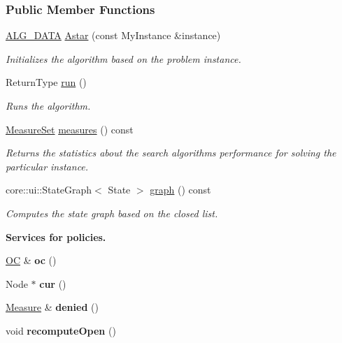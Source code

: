 \subsubsection*{Public Member Functions}
\begin{DoxyCompactItemize}
\item 
\hyperlink{algorithm_8h_a64c012078deee9a30405e18ec11e6360}{A\+L\+G\+\_\+\+D\+A\+TA} \hyperlink{structAstar_ac4d21b58ac95967feed0559ebfe6a9a4}{Astar} (const My\+Instance \&instance)
\begin{DoxyCompactList}\small\item\em Initializes the algorithm based on the problem instance. \end{DoxyCompactList}\item 
Return\+Type \hyperlink{structAstar_a11b9f8a8b4b172d58be86ffe19cd02d5}{run} ()
\begin{DoxyCompactList}\small\item\em Runs the algorithm. \end{DoxyCompactList}\item 
\hyperlink{structMeasureSet}{Measure\+Set} \hyperlink{structAstar_a8bc4daf2cdbf28a19cc802f415996654}{measures} () const 
\begin{DoxyCompactList}\small\item\em Returns the statistics about the search algorithm\textquotesingle{}s performance for solving the particular instance. \end{DoxyCompactList}\item 
core\+::ui\+::\+State\+Graph$<$ State $>$ \hyperlink{structAstar_adaf62b4847f7f3215bf8ec25739415b0}{graph} () const 
\begin{DoxyCompactList}\small\item\em Computes the state graph based on the closed list. \end{DoxyCompactList}\end{DoxyCompactItemize}
\begin{Indent}{\bf Services for policies.}\par
\begin{DoxyCompactItemize}
\item 
\hyperlink{structAstar_ad95c7f756780188272cd6e3c11e126de}{OC} \& {\bfseries oc} ()\hypertarget{structAstar_a97ccdf223e2e3dc8aa94a27c11fb93c0}{}\label{structAstar_a97ccdf223e2e3dc8aa94a27c11fb93c0}

\item 
Node $\ast$ {\bfseries cur} ()\hypertarget{structAstar_a15856fccf5885a316155632439539bd6}{}\label{structAstar_a15856fccf5885a316155632439539bd6}

\item 
\hyperlink{structMeasure}{Measure} \& {\bfseries denied} ()\hypertarget{structAstar_a969d23607126e1b86485f80bde9a2db3}{}\label{structAstar_a969d23607126e1b86485f80bde9a2db3}

\item 
void {\bfseries recompute\+Open} ()\hypertarget{structAstar_ae0b0e647de113ebc3440f1e576508dec}{}\label{structAstar_ae0b0e647de113ebc3440f1e576508dec}

\end{DoxyCompactItemize}
\end{Indent}
